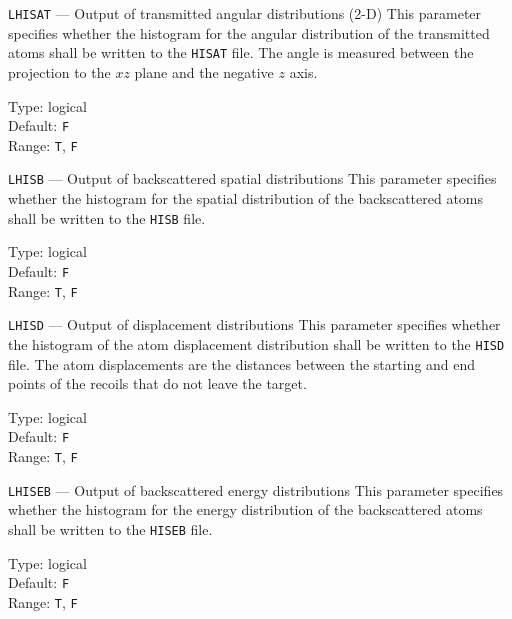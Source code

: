 \begin{keydescription}{\texttt{LHISAT} --- Output of transmitted angular distributions (2-D)}
%
  This parameter specifies whether the histogram for the angular distribution of the 
  transmitted atoms shall be written to the \texttt{HISAT} file. The angle is measured
  between the projection to the $xz$ plane and the negative $z$ axis.
  \begin{keytab}
    Type:    \> logical \\
    Default: \> \texttt{F} \\
    Range:   \> \texttt{T}, \texttt{F} 
  \end{keytab}
\end{keydescription}

\begin{keydescription}{\texttt{LHISB} --- Output of backscattered spatial distributions}
%
  This parameter specifies whether the histogram for the spatial distribution of the 
  backscattered atoms shall be written to the \texttt{HISB} file.
  \begin{keytab}
    Type:    \> logical \\
    Default: \> \texttt{F} \\
    Range:   \> \texttt{T}, \texttt{F} 
  \end{keytab}
\end{keydescription}

\begin{keydescription}{\texttt{LHISD} --- Output of displacement distributions}
%
  This parameter specifies whether the histogram of the atom displacement distribution shall be 
  written to the \texttt{HISD} file. The atom displacements are the distances between the 
  starting and end points of the recoils that do not leave the target.
  \begin{keytab}
    Type:    \> logical \\
    Default: \> \texttt{F} \\
    Range:   \> \texttt{T}, \texttt{F} 
  \end{keytab}
\end{keydescription}

\begin{keydescription}{\texttt{LHISEB} --- Output of backscattered energy distributions}
%
  This parameter specifies whether the histogram for the energy distribution of the 
  backscattered atoms shall be written to the \texttt{HISEB} file.
  \begin{keytab}
    Type:    \> logical \\
    Default: \> \texttt{F} \\
    Range:   \> \texttt{T}, \texttt{F} 
  \end{keytab}
\end{keydescription}

